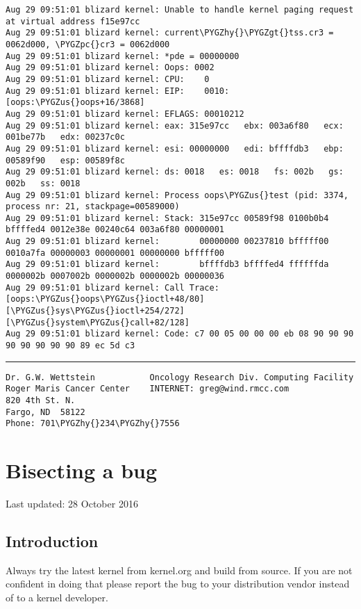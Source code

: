 \documentclass[a4paper,8pt,english]{sphinxmanual}
\def\PYGZus{\char`\_}
\def\PYGZgt{\char`\>}
\def\PYGZpc{\char`\%}
\def\PYGZhy{\char`\-}
\begin{document}
\begin{Verbatim}[commandchars=\\\{\}]
Aug 29 09:51:01 blizard kernel: Unable to handle kernel paging request at virtual address f15e97cc
Aug 29 09:51:01 blizard kernel: current\PYGZhy{}\PYGZgt{}tss.cr3 = 0062d000, \PYGZpc{}cr3 = 0062d000
Aug 29 09:51:01 blizard kernel: *pde = 00000000
Aug 29 09:51:01 blizard kernel: Oops: 0002
Aug 29 09:51:01 blizard kernel: CPU:    0
Aug 29 09:51:01 blizard kernel: EIP:    0010:[oops:\PYGZus{}oops+16/3868]
Aug 29 09:51:01 blizard kernel: EFLAGS: 00010212
Aug 29 09:51:01 blizard kernel: eax: 315e97cc   ebx: 003a6f80   ecx: 001be77b   edx: 00237c0c
Aug 29 09:51:01 blizard kernel: esi: 00000000   edi: bffffdb3   ebp: 00589f90   esp: 00589f8c
Aug 29 09:51:01 blizard kernel: ds: 0018   es: 0018   fs: 002b   gs: 002b   ss: 0018
Aug 29 09:51:01 blizard kernel: Process oops\PYGZus{}test (pid: 3374, process nr: 21, stackpage=00589000)
Aug 29 09:51:01 blizard kernel: Stack: 315e97cc 00589f98 0100b0b4 bffffed4 0012e38e 00240c64 003a6f80 00000001
Aug 29 09:51:01 blizard kernel:        00000000 00237810 bfffff00 0010a7fa 00000003 00000001 00000000 bfffff00
Aug 29 09:51:01 blizard kernel:        bffffdb3 bffffed4 ffffffda 0000002b 0007002b 0000002b 0000002b 00000036
Aug 29 09:51:01 blizard kernel: Call Trace: [oops:\PYGZus{}oops\PYGZus{}ioctl+48/80] [\PYGZus{}sys\PYGZus{}ioctl+254/272] [\PYGZus{}system\PYGZus{}call+82/128]
Aug 29 09:51:01 blizard kernel: Code: c7 00 05 00 00 00 eb 08 90 90 90 90 90 90 90 90 89 ec 5d c3
\end{Verbatim}


\bigskip\hrule{}\bigskip


\begin{Verbatim}[commandchars=\\\{\}]
Dr. G.W. Wettstein           Oncology Research Div. Computing Facility
Roger Maris Cancer Center    INTERNET: greg@wind.rmcc.com
820 4th St. N.
Fargo, ND  58122
Phone: 701\PYGZhy{}234\PYGZhy{}7556
\end{Verbatim}


\chapter{Bisecting a bug}
\label{admin-guide/bug-bisect::doc}\label{admin-guide/bug-bisect:bisecting-a-bug}
Last updated: 28 October 2016


\section{Introduction}
\label{admin-guide/bug-bisect:introduction}
Always try the latest kernel from kernel.org and build from source. If you are
not confident in doing that please report the bug to your distribution vendor
instead of to a kernel developer.
\end{document}

